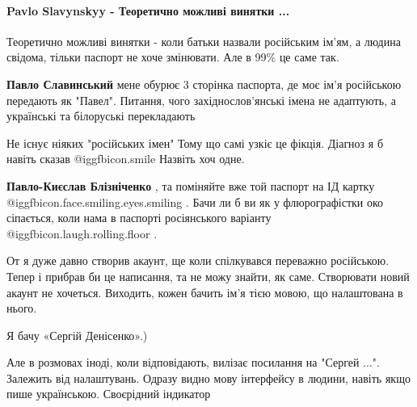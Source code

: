  
 
 
 
 

\paragraph{Pavlo Slavynskyy - Теоретично можливі винятки ...}
\label{sec:12_10_2019.fb.malanjuk_lesja.1.patriotizm_imja_jazyk.cmt.1.slavynskyy_vynjatky}

\begin{itemize} %
Теоретично можливі винятки - коли батьки назвали російським ім'ям, а людина свідома, тільки паспорт не хоче змінювати.
Але в 99\% це саме так.

\begin{itemize} %
\textbf{Павло Славинський} мене обурює 3 сторінка паспорта, де моє ім'я російською передають як "Павел". Питання, чого західнослов'янські імена не адаптують, а українські та білоруські перекладають

Не існує ніяких "російських імен" Тому що самі узкіє це фікція. Діагноз я б навіть сказав  @igg{fbicon.smile}  Назвіть хоч одне.

\textbf{Павло-Києслав Блізніченко} , та поміняйте вже той паспорт на ІД картку  @igg{fbicon.face.smiling.eyes.smiling} . Бачи ли б ви як у флюрографістки око сіпається, коли нама в паспорті росіянського варіанту  @igg{fbicon.laugh.rolling.floor} .
\end{itemize} %


От я дуже давно створив акаунт, ще коли спілкувався переважно російською. Тепер
і прибрав би це написання, та не можу знайти, як саме. Створювати новий акаунт
не хочеться. Виходить, кожен бачить ім'я тією мовою, що налаштована в нього.

\begin{itemize} %
Я бачу «Сергій Денісенко».)


Але в розмовах іноді, коли відповідають, вилізає посилання на "Сергей ...".
Залежить від налаштувань. Одразу видно мову інтерфейсу в людини, навіть якщо
пише українською. Своєрідний індикатор


\end{itemize}
\end{itemize}
